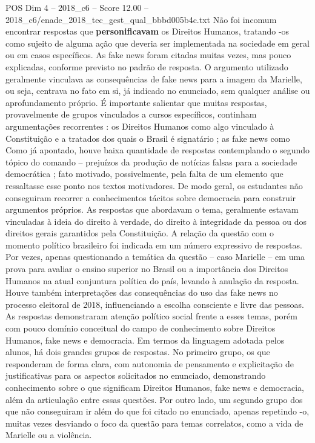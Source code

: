 \begin{textsample}{POS Dim 4 – 2018\_c6 – Score 12.00 – 2018\_c6/enade\_2018\_tec\_gest\_qual\_bbbd005b4c.txt}
Não foi incomum encontrar respostas que \textbf{personificavam} os Direitos Humanos, tratando -os como sujeito de alguma ação que deveria ser implementada na sociedade em geral ou em casos específicos.
As fake news foram citadas muitas vezes, mas pouco explicadas, conforme previsto no padrão de resposta.
O argumento utilizado geralmente vinculava as consequências de fake news para a imagem da Marielle, ou seja, centrava no fato em si, já indicado no enunciado, sem qualquer análise ou aprofundamento próprio.
É importante salientar que muitas respostas, provavelmente de grupos vinculados a cursos específicos, continham argumentações recorrentes : os Direitos Humanos como algo vinculado à Constituição e a tratados dos quais o Brasil é signatário ; as fake news como Como já apontado, houve baixa quantidade de respostas contemplando o segundo tópico do comando – prejuízos da produção de notícias falsas para a sociedade democrática ; fato motivado, possivelmente, pela falta de um elemento que ressaltasse esse ponto nos textos motivadores.
De modo geral, os estudantes não conseguiram recorrer a conhecimentos tácitos sobre democracia para construir argumentos próprios.
As respostas que abordavam o tema, geralmente estavam vinculadas à ideia do direito à verdade, do direito à integridade da pessoa ou dos direitos gerais garantidos pela Constituição.
A relação da questão com o momento político brasileiro foi indicada em um número expressivo de respostas.
Por vezes, apenas questionando a temática da questão – caso Marielle – em uma prova para avaliar o ensino superior no Brasil ou a importância dos Direitos Humanos na atual conjuntura política do país, levando à anulação da resposta.
Houve também interpretações das consequências do uso das fake news no processo eleitoral de 2018, influenciando a escolha consciente e livre das pessoas.
As respostas demonstraram atenção político social frente a esses temas, porém com pouco domínio conceitual do campo de conhecimento sobre Direitos Humanos, fake news e democracia.
Em termos da linguagem adotada pelos alunos, há dois grandes grupos de respostas.
No primeiro grupo, os que responderam de forma clara, com autonomia de pensamento e explicitação de justificativas para os aspectos solicitados no enunciado, demonstrando conhecimento sobre o que significam Direitos Humanos, fake news e democracia, além da articulação entre essas questões.
Por outro lado, um segundo grupo dos que não conseguiram ir além do que foi citado no enunciado, apenas repetindo -o, muitas vezes desviando o foco da questão para temas correlatos, como a vida de Marielle ou a violência.

\end{textsample}
